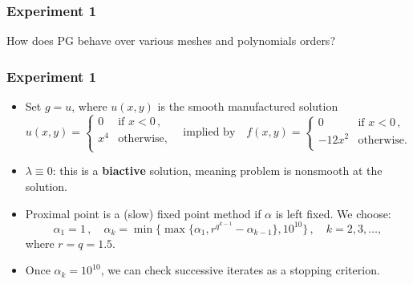 \documentclass[aspectratio=169,xcolor=dvipsnames,11pt]{beamer}
\begin{document}
\begin{frame}\frametitle{Experiment 1}
\begin{center}
{\color{Maroon} \Large How does PG behave over various meshes and polynomials orders?}
\end{center}
\end{frame}

\begin{frame}\frametitle{Experiment 1}
\begin{itemize}
\item Set $g=u$, where $u(x,y)$ is the smooth manufactured solution
\begin{equation}
\label{eq:Biactivity_SmoothManufacturedSolution}
	u(x,y)
	=
	\begin{cases}
		0 & \text{if~} x < 0\,,\\
		x^4 & \text{otherwise,}\\
	\end{cases}
	\quad
	\text{implied by}
	\quad
	f(x,y)
	=
	\begin{cases}
		0 & \text{if~} x < 0\,,\\
		-12x^2 & \text{otherwise.}\\
	\end{cases}
\end{equation}
\item $\lambda \equiv 0$:  this is a \textbf{biactive} solution, meaning
problem is nonsmooth at the solution.
\item Proximal point is a (slow) fixed point method if $\alpha$ is left fixed. We choose: 
\begin{equation}
\label{eq:ObstacleStepSizes_superexponential}
	\alpha_1 = 1\,,
	\quad
	\alpha_k
	=
	\min\bigl\{ \max\bigl\{\alpha_1,r^{q^{k-1}} - \alpha_{k-1}\bigr\} , 10^{10} \bigr\}
	\,,
	\quad
	k = 2,3,\ldots,
\end{equation}
where $r = q = 1.5$.  
\item Once $\alpha_k = 10^{10}$, we can check successive iterates as a stopping criterion.
\end{itemize}
\end{frame}
\end{document}
